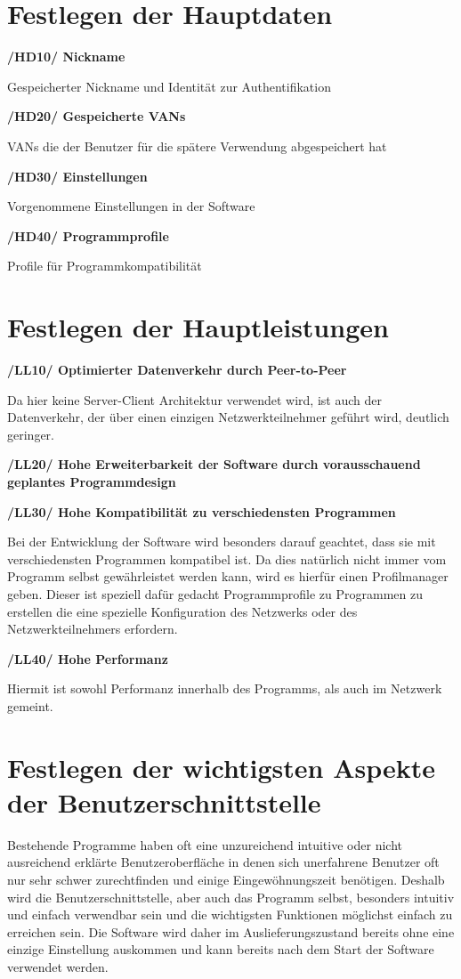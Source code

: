 \documentclass[a4paper,12pt]{scrreprt}
\begin{document}
	\section{Festlegen der Hauptdaten}
	\textbf {/HD10/ Nickname}
	
	Gespeicherter Nickname und Identität zur Authentifikation
	
	\textbf {/HD20/ Gespeicherte VANs}
	
	VANs die der Benutzer für die spätere Verwendung abgespeichert hat
	
	\textbf {/HD30/ Einstellungen}
	
	Vorgenommene Einstellungen in der Software
	
	\textbf {/HD40/ Programmprofile}
	
	Profile für Programmkompatibilität
	
		
	\section{Festlegen der Hauptleistungen}
	   \textbf{/LL10/ Optimierter Datenverkehr durch Peer-to-Peer}
		
		Da hier keine Server-Client Architektur verwendet wird, ist auch der Datenverkehr, der über einen einzigen Netzwerkteilnehmer geführt wird, deutlich geringer.
		
		\textbf {/LL20/ Hohe Erweiterbarkeit der Software durch vorausschauend geplantes Programmdesign}
		
		\textbf {/LL30/ Hohe Kompatibilität zu verschiedensten Programmen}
		
		Bei der Entwicklung der Software wird besonders darauf geachtet, dass sie mit verschiedensten Programmen kompatibel ist. Da dies natürlich nicht immer vom Programm selbst gewährleistet werden kann, wird es hierfür einen Profilmanager geben. Dieser ist speziell dafür gedacht Programmprofile zu Programmen zu erstellen die eine spezielle Konfiguration des Netzwerks oder des Netzwerkteilnehmers erfordern.
		
		\textbf {/LL40/ Hohe Performanz}
		
		Hiermit ist sowohl Performanz innerhalb des Programms, als auch im Netzwerk gemeint.
	\section{Festlegen der wichtigsten Aspekte der Benutzerschnittstelle}
		
		Bestehende Programme haben oft eine unzureichend intuitive oder nicht ausreichend erklärte Benutzeroberfläche in denen sich unerfahrene Benutzer oft nur sehr schwer zurechtfinden und einige Eingewöhnungszeit benötigen. Deshalb wird die Benutzerschnittstelle, aber auch das Programm selbst, besonders intuitiv und einfach verwendbar sein und die wichtigsten Funktionen möglichst einfach zu erreichen sein. Die Software wird daher im Auslieferungszustand bereits ohne eine einzige Einstellung auskommen und kann bereits nach dem Start der Software verwendet werden.
		
\end{document}
